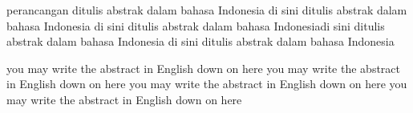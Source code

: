 \begin{Abstrak}
perancangan ditulis abstrak dalam bahasa Indonesia di sini ditulis abstrak dalam bahasa Indonesia di sini ditulis abstrak dalam bahasa Indonesiadi sini ditulis abstrak dalam bahasa Indonesia di sini ditulis abstrak dalam bahasa Indonesia
\end{Abstrak}

\begin{Abstract}
you may write the abstract in English down on here you may write the abstract in English down on here you may write the abstract in English down on here you may write the abstract in English down on here
\end{Abstract} 
